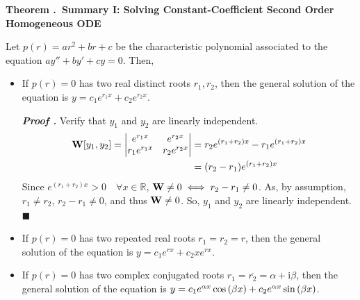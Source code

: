 \documentclass[12pt, a4paper]{article}
\newcounter{index}[subsection]
\newenvironment*{thm}[1]{\begin{tcolorbox}\par\noindent\textbf{Theorem \thesubsection.\stepcounter{index}\theindex\ #1} \par}{\par\end{tcolorbox}}
\newcounter{nprf}[subsection]
\newenvironment*{prf}{\par\indent\textbf{\textit{Proof \stepcounter{nprf}\thenprf.}}}{\hfill$\blacksquare$\par}
\def\R{{\mathbb{R}}}
\def\i{{\mathrm{i}}}
\def\W{\vb W}
\begin{document}
\begin{thm}{Summary I: Solving Constant-Coefficient Second Order Homogeneous ODE}
	Let	$p(r)=ar^2+br+c$ be the characteristic polynomial associated to the equation $ay''+by'+cy=0$. Then, 
	\begin{itemize}
		\item If $p(r)=0$ has two real distinct roots $r_1,r_2$, then the general solution of the equation is $y=c_1e^{r_1x}+c_2e^{r_2x}$. \begin{prf}
			Verify that $y_1$ and $y_2$ are linearly independent. \begin{align*}\W\qty[y_1,y_2]=\mqty|e^{r_1x}&e^{r_2x}\\r_1e^{r_1x}&r_2e^{r_2x}|&=r_2e^{\qty(r_1+r_2)x}-r_1e^{\qty(r_1+r_2)x}\\&=\qty(r_2-r_1)e^{\qty(r_1+r_2)x}\end{align*} Since $e^{(r_1+r_2)x}>0\quad\forall x\in\R$, $\W\neq0\iff r_2-r_1\neq0$. As, by assumption, $r_1\neq r_2$, $r_2-r_1\neq0$, and thus $\W\neq0$. So, $y_1$ and $y_2$ are linearly independent. 
		\end{prf}
		\item If $p(r)=0$ has two repeated real roots $r_1=r_2=r$, then the general solution of the equation is $y=c_1e^{rx}+c_2xe^{rx}$.
		\item If $p(r)=0$ has two complex conjugated roots $r_1=\overline{r_2}=\alpha+\i\beta$, then the general solution of the equation is $y=c_1e^{\alpha x}\cos\qty(\beta x)+c_2e^{\alpha x}\sin\qty(\beta x)$.
	\end{itemize}
\end{thm}
\end{document}
